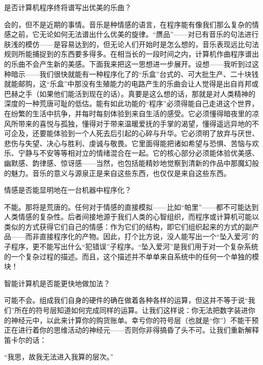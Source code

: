 \begin{description}[speculation]
\item[问题]是否计算机程序终将谱写出优美的乐曲？
\item[推测]会的，但不是近期的事情。音乐是种情感的语言，在程序能有像我们那么复杂的情感之前，它无论如何无法谱出什么优美的旋律。“赝品”——对已有音乐的句法进行肤浅的模仿——是容易达到的，但无论人们开始时是怎么想的，音乐表现远比句法规则所能捕捉到的东西要多得多。在相当长的一段时间之内，计算机作曲程序谱出的乐曲不会产生新的美感。下面我来把这一思想进一步展开。设想——我听到过这种暗示——我们很快就能有一种程序化了的“乐盒”台式的、可大批生产、二十块钱就能邮购，这“乐盒”中那没有生殖能力的电路产生的乐曲会让人觉得是出自肖邦或巴赫之手（如果他们能活到现在的话）。真要是这么想的话，那就是对人类精神的深度的一种荒唐可耻的低估。能有如此功能的“程序”必须得能自己走进这个世界，在纷繁的生活中抗争，并每时每刻体验到来自生活的感受。它必须懂得暗夜里的凉风所带来的喜悦与孤独，懂得对于带来温暖爱抚的手掌的渴望，懂得遥远异地的不可企及，还要能体验到一个人死去后引起的心碎与升华。它必须明了放弃与厌世、悲伤与失望、决心与胜利、虔诚与敬畏。它里面得能把诸如希望与恐惧、苦恼与欢乐、宁静与不安等等相对立的情绪混合在一起。它的核心部分必须能体验优美感、幽默感、韵律感、惊讶感——当然，也包括能精妙地觉察到清新的作品中那魔幻般的魅力。音乐的意义与源泉正是来自这些东西，也仅仅是来自这些东西。

\item[问题]情感是否能显明地在一台机器中程序化？
\item[推测]不能。那将是荒唐的。任何对于情感的直接模拟——比如“帕里”——都不可能达到人类情感的复杂性。后者间接地源于我们人类的心智组织，而程序或计算机可能以类似的方式获得它们自己的情感：作为它们的结构，即它们组织起来的方式的副产品——而非直接程序化的产物。因此，打个比方说，没人能写出一个“坠入爱河”的子程序，更不能写出什么“犯错误”子程序。“坠入爱河”是我们用于对一个复杂系统的一个复杂过程的描述。而且，这个描述并不单单来自系统中的任何一个单独的模块！

\item[问题]智能计算机是否能更快地做加法？
\item[推测]可能不会。组成我们自身的硬件的确在做着各种各样的运算，但这并不等于说“我们”所在的符号层知道如何完成同样的运算。让我们这样说：你无法把数字装进你的神经元中，以此来计算你的购货账单。幸亏你的符号层（也就是“你”）不能干预正在进行着你的思维活动的神经元——否则你非得搞昏了头不可。让我们重新解释笛卡尔的话：
    \begin{center}
      “我思，故我无法进入我算的层次。”
    \end{center}


\end{description}
